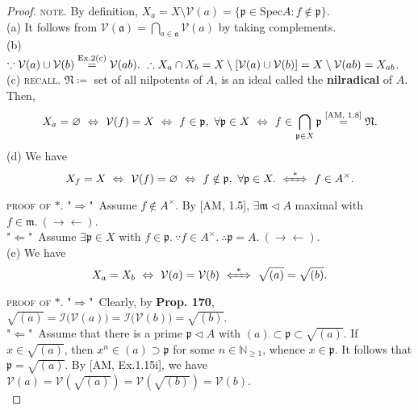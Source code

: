 \documentclass[12pt,a4paper,footinclude=true,headinclude=true]{scrbook} %
\newcommand\myeq[1]{\stackrel{\textnormal{#1}}{=}}
\begin{document}
\begin{proof}
    \textsc{note.} By definition, $X_a=X\setminus\mathcal{V}(a)=\{\mathfrak{p}\in\mathrm{Spec}A:f\notin\mathfrak{p}\}$.\\ (a) It follows from $\mathcal{V}(\mathfrak{a})=\bigcap_{a\in\mathfrak{a}}\mathcal{V}(a)$ by taking complements.\\ (b) $\because \mathcal{V}(a)\cup\mathcal{V}(b)\myeq{\text{Ex.2(c)}} \mathcal{V}(ab).\ \therefore X_a\cap X_b=X\setminus [\mathcal{V}(a)\cup\mathcal{V}(b)]=X\setminus\mathcal{V}(ab)=X_{ab}$.\\
    (c) \textsc{recall.} $\mathfrak{N}\coloneqq$ set of all nilpotents of $A$, is an ideal called the \textbf{nilradical} of $A$. Then,
    \begin{align*}
        X_a=\varnothing\ \Leftrightarrow\ \mathcal{V}(f)=X\ \Leftrightarrow\ f\in\mathfrak{p},\ \forall\mathfrak{p}\in X\ \Leftrightarrow\ f\in\bigcap_{\mathfrak{p}\in X}\mathfrak{p}\myeq{\text{[AM, 1.8]}} \mathfrak{N}.
    \end{align*}
    (d) We have
    \begin{align*}
        X_f=X\ \Leftrightarrow\ \mathcal{V}(f)=\varnothing\ \Leftrightarrow\ f\notin\mathfrak{p},\ \forall\mathfrak{p}\in X.\ \xLeftrightarrow{~\ast~}\ f\in A^\times.
    \end{align*}
    \textsc{proof of $\ast$.} "$\Rightarrow$"\ Assume $f\notin A^\times$. By [AM, 1.5], $\exists\mathfrak{m}\triangleleft A$ maximal with $f\in\mathfrak{m}.\ (\to\gets)$. \\ "$\Leftarrow$"\ Assume $\exists\mathfrak{p}\in X$ with $f\in\mathfrak{p}.\ \because f\in A^\times.\ \therefore\mathfrak{p}=A.\ (\to\gets)$.\\
    (e) We have 
    \begin{align*}
        X_a=X_b\ \Leftrightarrow\ \mathcal{V}(a)=\mathcal{V}(b)\ \xLeftrightarrow{~\ast~}\ \sqrt{(a)}=\sqrt{(b)}.
    \end{align*}
    \textsc{proof of $\ast$.} "$\Rightarrow$"\ Clearly, by \textbf{Prop. 170}, $\sqrt{(a)}=\mathcal{I(V}(a))=\mathcal{I(V}(b))=\sqrt{(b)}$.\\ "$\Leftarrow$"\ Assume that there is a prime $\mathfrak{p}\triangleleft A$ with $(a)\subset\mathfrak{p}\subset\sqrt{(a)}$. If $x\in\sqrt{(a)}$, then $x^n\in(a)\supset\mathfrak{p}$ for some $n\in\mathbb{N}_{\geq1}$, whence $x\in\mathfrak{p}$. It follows that $\mathfrak{p}=\sqrt{(a)}$. By [AM, Ex.1.15i], we have $\mathcal{V}(a)=\mathcal{V}(\sqrt{(a)})=\mathcal{V}(\sqrt{(b)})=\mathcal{V}(b)$.\\

\end{proof}
\end{document}
